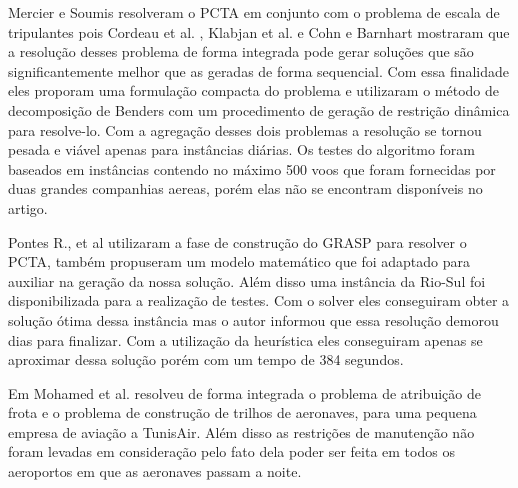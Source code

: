 		
Mercier e Soumis \cite{mercier2007} resolveram o PCTA em conjunto com
o problema de escala de tripulantes pois Cordeau et al. \cite{cordeau2001},
Klabjan et al. \cite{klabjan2002} e Cohn e Barnhart \cite{mainville2003}
mostraram que a resolução desses problema de forma integrada pode gerar
soluções que são significantemente melhor que as geradas de forma sequencial.
Com essa finalidade eles proporam uma formulação compacta do problema e
utilizaram o método de decomposição de Benders com um procedimento de geração
de restrição dinâmica para resolve-lo. Com a agregação desses dois problemas a
resolução se tornou pesada e viável apenas para instâncias diárias. Os testes
do algoritmo foram baseados em instâncias contendo no máximo 500 voos que
foram fornecidas por duas grandes companhias aereas, porém elas não se
encontram disponíveis no artigo. 
		
Pontes R., et al \cite{pontes2002} utilizaram a fase de construção do GRASP
para resolver o PCTA, também propuseram um modelo matemático que foi
adaptado para auxiliar na geração da nossa solução. Além disso uma instância
da Rio-Sul foi disponibilizada para a realização de testes. Com o solver eles
conseguiram obter a solução ótima dessa instância mas o autor informou que
essa resolução demorou dias para finalizar. Com a utilização da heurística
eles conseguiram apenas se aproximar dessa solução porém com um tempo de 384
segundos.
		
Em \cite{mohamed2011} Mohamed et al. resolveu de forma integrada o problema
de atribuição de frota e o problema de construção de trilhos de aeronaves,
para uma pequena empresa de aviação a TunisAir. Além disso as restrições de
manutenção não foram levadas em consideração pelo fato dela poder ser feita
em todos os aeroportos em que as aeronaves passam a noite.
		
 